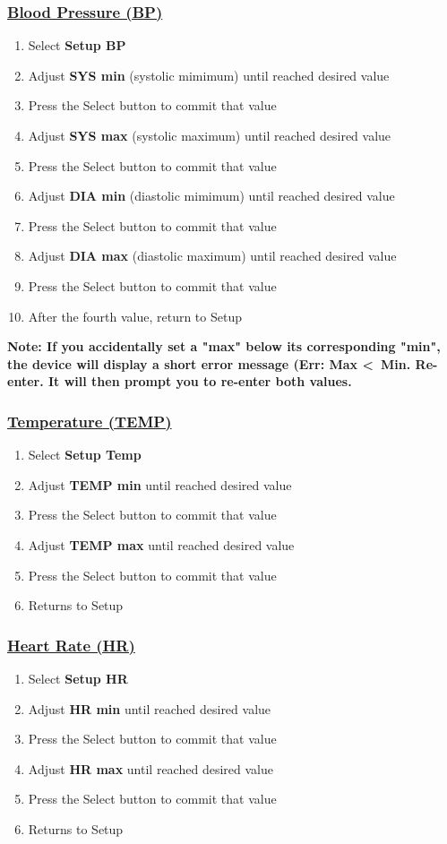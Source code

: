 \subsubsection{\underline{Blood Pressure (BP)}}
\begin{enumerate}
	\item Select \textbf{Setup BP}
	\item Adjust \textbf{SYS min} (systolic mimimum) until reached desired value
	\item Press the Select button to commit that value
	\item Adjust \textbf{SYS max} (systolic maximum) until reached desired value
	\item Press the Select button to commit that value
	\item Adjust \textbf{DIA min} (diastolic mimimum) until reached desired value
	\item Press the Select button to commit that value
	\item Adjust \textbf{DIA max} (diastolic maximum) until reached desired value
	\item Press the Select button to commit that value
	\item After the fourth value, return to Setup
\end{enumerate}
\textbf{Note: If you accidentally set a "max" below its corresponding "min", the device will display a short error message (Err: Max \textless\ Min. Re-enter. It will then prompt you to re-enter both values.}
\subsubsection{\underline{Temperature (TEMP)}}
\begin{enumerate}
	\item Select \textbf{Setup Temp}
	\item Adjust \textbf{TEMP min} until reached desired value
	\item Press the Select button to commit that value
	\item Adjust \textbf{TEMP max} until reached desired value
	\item Press the Select button to commit that value
	\item Returns to Setup
\end{enumerate}
\subsubsection{\underline{Heart Rate (HR)}}
\begin{enumerate}
	\item Select \textbf{Setup HR}
	\item Adjust \textbf{HR min} until reached desired value
	\item Press the Select button to commit that value
	\item Adjust \textbf{HR max} until reached desired value
	\item Press the Select button to commit that value
	\item Returns to Setup
\end{enumerate}

